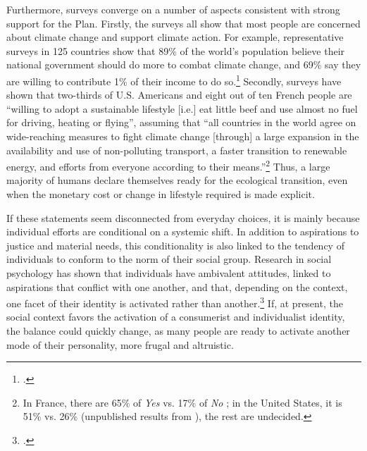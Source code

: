 \documentclass[a5paper,english,openany]{memoir}
\begin{document}
Furthermore, surveys converge on a number of aspects consistent with strong support for the Plan. Firstly, the surveys all show that most people are concerned about climate change and support climate action. For example, representative surveys in 125 countries show that 89\% of the world's population believe their national government should do more to combat climate change, and 69\% say they are willing to contribute 1\% of their income to do so.\footnote{\citet{andre_globally_2024}.} %
Secondly, surveys have shown that two-thirds of U.S. Americans and eight out of ten French people are ``willing to adopt a sustainable lifestyle [i.e.] eat little beef and use almost no fuel for driving, heating or flying'', %
assuming that ``all countries in the world agree on wide-reaching measures to fight climate change [through] a large expansion in the availability and use of non-polluting transport, a faster transition to renewable energy, and efforts from everyone according to their means.''\footnote{In France, there are 65\% of \textit{Yes} vs. 17\% of \textit{No} \citep{douenne_french_2020}; in the United States, it is 51\% vs. 26\% (unpublished results from \citealp{dechezlepretre_fighting_2022}), the rest are undecided.} %
Thus, a large majority of humans declare themselves ready for the ecological transition, %
even when the monetary cost or change in lifestyle required is made explicit. 

If these statements seem disconnected from everyday choices, it is mainly because individual efforts are conditional on a systemic shift. In addition to aspirations to justice and material needs, this conditionality is also linked to the tendency of individuals to conform to the norm of their social group. Research in social psychology has shown that individuals have ambivalent attitudes, linked to aspirations that conflict with one another, and that, depending on the context, one facet of their identity is activated rather than another.\footnote{\citet{kim_normative_2012,fielding_social_2016}.} %
If, at present, the social context favors %
the activation of a consumerist and individualist identity, the balance could quickly change, as many people are ready to activate another mode of their personality, more frugal and altruistic.
\end{document}

